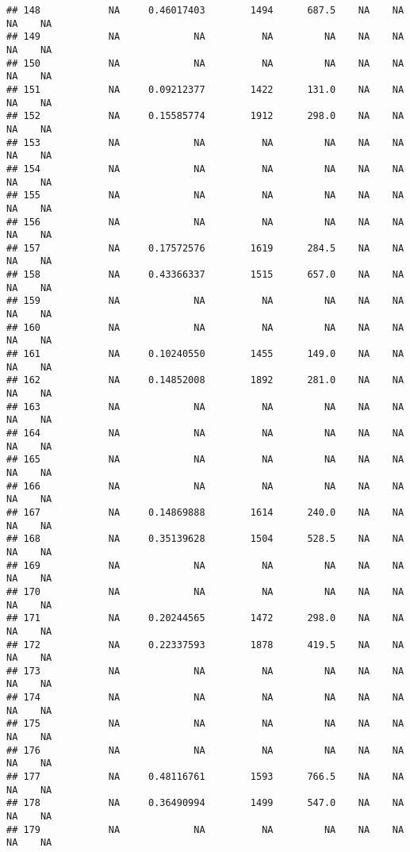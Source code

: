 \documentclass[]{article}
\begin{document}
\begin{verbatim}
## 148            NA     0.46017403        1494      687.5    NA    NA    NA    NA
## 149            NA             NA          NA         NA    NA    NA    NA    NA
## 150            NA             NA          NA         NA    NA    NA    NA    NA
## 151            NA     0.09212377        1422      131.0    NA    NA    NA    NA
## 152            NA     0.15585774        1912      298.0    NA    NA    NA    NA
## 153            NA             NA          NA         NA    NA    NA    NA    NA
## 154            NA             NA          NA         NA    NA    NA    NA    NA
## 155            NA             NA          NA         NA    NA    NA    NA    NA
## 156            NA             NA          NA         NA    NA    NA    NA    NA
## 157            NA     0.17572576        1619      284.5    NA    NA    NA    NA
## 158            NA     0.43366337        1515      657.0    NA    NA    NA    NA
## 159            NA             NA          NA         NA    NA    NA    NA    NA
## 160            NA             NA          NA         NA    NA    NA    NA    NA
## 161            NA     0.10240550        1455      149.0    NA    NA    NA    NA
## 162            NA     0.14852008        1892      281.0    NA    NA    NA    NA
## 163            NA             NA          NA         NA    NA    NA    NA    NA
## 164            NA             NA          NA         NA    NA    NA    NA    NA
## 165            NA             NA          NA         NA    NA    NA    NA    NA
## 166            NA             NA          NA         NA    NA    NA    NA    NA
## 167            NA     0.14869888        1614      240.0    NA    NA    NA    NA
## 168            NA     0.35139628        1504      528.5    NA    NA    NA    NA
## 169            NA             NA          NA         NA    NA    NA    NA    NA
## 170            NA             NA          NA         NA    NA    NA    NA    NA
## 171            NA     0.20244565        1472      298.0    NA    NA    NA    NA
## 172            NA     0.22337593        1878      419.5    NA    NA    NA    NA
## 173            NA             NA          NA         NA    NA    NA    NA    NA
## 174            NA             NA          NA         NA    NA    NA    NA    NA
## 175            NA             NA          NA         NA    NA    NA    NA    NA
## 176            NA             NA          NA         NA    NA    NA    NA    NA
## 177            NA     0.48116761        1593      766.5    NA    NA    NA    NA
## 178            NA     0.36490994        1499      547.0    NA    NA    NA    NA
## 179            NA             NA          NA         NA    NA    NA    NA    NA

\end{verbatim}
\end{document}

